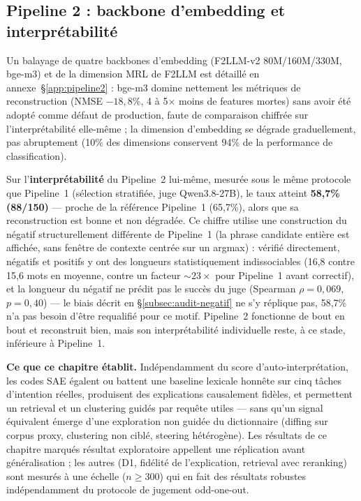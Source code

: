 \documentclass[11pt]{article}
\begin{document}
\subsection{Pipeline 2 : backbone d'embedding et interprétabilité}
\label{subsec:pipeline2-scale}

Un balayage de quatre backbones d'embedding (F2LLM-v2 80M/160M/330M, bge-m3)
et de la dimension MRL de F2LLM est détaillé en annexe~\S\ref{app:pipeline2}
: bge-m3 domine nettement les métriques de reconstruction (NMSE $-18,8\%$,
4 à 5$\times$ moins de features mortes) sans avoir été adopté comme défaut de
production, faute de comparaison chiffrée sur l'interprétabilité elle-même ;
la dimension d'embedding se dégrade graduellement, pas abruptement (10\% des
dimensions conservent 94\% de la performance de classification).

Sur l'\textbf{interprétabilité} du Pipeline~2 lui-même, mesurée sous le même
protocole que Pipeline~1 (sélection stratifiée, juge Qwen3.8-27B), le taux
atteint \textbf{58,7\% (88/150)} --- proche de la référence Pipeline~1
(65,7\%), alors que sa reconstruction est bonne et non dégradée. Ce chiffre
utilise une construction du négatif structurellement différente de
Pipeline~1 (la phrase candidate entière est affichée, sans fenêtre de
contexte centrée sur un argmax) : vérifié directement, négatifs et positifs
y ont des longueurs statistiquement indissociables (16,8 contre 15,6 mots en
moyenne, contre un facteur ${\sim}23\times$ pour Pipeline~1 avant correctif),
et la longueur du négatif ne prédit pas le succès du juge (Spearman
$\rho=0,069$, $p=0,40$) --- le biais décrit en \S\ref{subsec:audit-negatif}
ne s'y réplique pas, 58,7\% n'a pas besoin d'être requalifié pour ce motif.
Pipeline~2 fonctionne de bout en bout et reconstruit bien, mais son
interprétabilité individuelle reste, à ce stade, inférieure à Pipeline~1.

\medskip
\noindent\textbf{Ce que ce chapitre établit.} Indépendamment du score
d'auto-interprétation, les codes SAE égalent ou battent une baseline
lexicale honnête sur cinq tâches d'intention réelles, produisent des
explications causalement fidèles, et permettent un retrieval et un
clustering guidés par requête utiles --- sans qu'un signal équivalent
émerge d'une exploration non guidée du dictionnaire (diffing sur corpus
proxy, clustering non ciblé, steering hétérogène). Les résultats de ce
chapitre marqués \og{}résultat exploratoire\fg{} appellent une réplication
avant généralisation ; les autres (D1, fidélité de l'explication, retrieval
avec reranking) sont mesurés à une échelle ($n\geq 300$) qui en fait des
résultats robustes indépendamment du protocole de jugement odd-one-out.
\newpage
\end{document}
